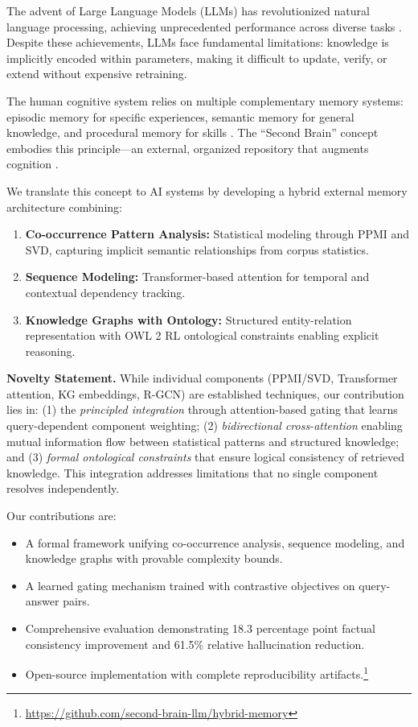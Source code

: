 \documentclass[conference]{IEEEtran}
\begin{document}
The advent of Large Language Models (LLMs) has revolutionized natural language processing, achieving unprecedented performance across diverse tasks \cite{brown2020language, chowdhery2022palm}. Despite these achievements, LLMs face fundamental limitations: knowledge is implicitly encoded within parameters, making it difficult to update, verify, or extend without expensive retraining.

The human cognitive system relies on multiple complementary memory systems: episodic memory for specific experiences, semantic memory for general knowledge, and procedural memory for skills \cite{tulving1972episodic}. The ``Second Brain'' concept embodies this principle---an external, organized repository that augments cognition \cite{forte2022building}.

We translate this concept to AI systems by developing a hybrid external memory architecture combining:

\begin{enumerate}[leftmargin=*]
    \item \textbf{Co-occurrence Pattern Analysis:} Statistical modeling through PPMI and SVD, capturing implicit semantic relationships from corpus statistics.
    
    \item \textbf{Sequence Modeling:} Transformer-based attention for temporal and contextual dependency tracking.
    
    \item \textbf{Knowledge Graphs with Ontology:} Structured entity-relation representation with OWL 2 RL ontological constraints enabling explicit reasoning.
\end{enumerate}

\textbf{Novelty Statement.} While individual components (PPMI/SVD, Transformer attention, KG embeddings, R-GCN) are established techniques, our contribution lies in: (1) the \textit{principled integration} through attention-based gating that learns query-dependent component weighting; (2) \textit{bidirectional cross-attention} enabling mutual information flow between statistical patterns and structured knowledge; and (3) \textit{formal ontological constraints} that ensure logical consistency of retrieved knowledge. This integration addresses limitations that no single component resolves independently.

Our contributions are:
\begin{itemize}[leftmargin=*]
    \item A formal framework unifying co-occurrence analysis, sequence modeling, and knowledge graphs with provable complexity bounds.
    \item A learned gating mechanism trained with contrastive objectives on query-answer pairs.
    \item Comprehensive evaluation demonstrating 18.3 percentage point factual consistency improvement and 61.5\% relative hallucination reduction.
    \item Open-source implementation with complete reproducibility artifacts.\footnote{\url{https://github.com/second-brain-llm/hybrid-memory}}
\end{itemize}
\end{document}

